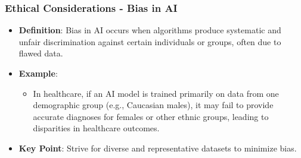 \documentclass[aspectratio=169]{beamer}
\begin{document}
\begin{frame}[fragile]
    \frametitle{Ethical Considerations - Bias in AI}
    \begin{itemize}
        \item \textbf{Definition}: Bias in AI occurs when algorithms produce systematic and unfair 
        discrimination against certain individuals or groups, often due to flawed data.
        
        \item \textbf{Example}: 
        \begin{itemize}
            \item In healthcare, if an AI model is trained primarily on data from one demographic group 
            (e.g., Caucasian males), it may fail to provide accurate diagnoses for females or other 
            ethnic groups, leading to disparities in healthcare outcomes.
        \end{itemize}
        
        \item \textbf{Key Point}: Strive for diverse and representative datasets to minimize bias.
    \end{itemize}
\end{frame}
\end{document}
